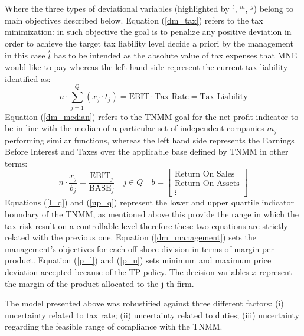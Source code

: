 \documentclass[conference,final,a4paper]{IEEEtran}
\begin{document}
Where the three types of deviational variables (highlighted by \(^t\),
\(^m\), \(^g\)) belong to main objectives described below. Equation (\ref{dm_tax}) refers to the tax minimization: in such objective the goal is to penalize any positive deviation in order to achieve the target tax liability level decide a priori by the management in this case $\overset{\star}{t}$ has to be intended as the absolute value of tax expenses that MNE would like to pay whereas the left hand side represent the current tax liability identified as:
  $$
  n\cdot \sum^{Q}_{j=1}(x_j\cdot t_j)  = \text{EBIT} \cdot \text{Tax Rate} = \text {Tax Liability} 
  $$
  Equation (\ref{dm_median}) refers to the TNMM goal for the net profit indicator to be in line with the median of a particular set of independent companies $m_j$ performing similar functions, whereas the left hand side represents the Earnings Before Interest and Taxes over the applicable base defined by TNMM in other terms:
  $$
  n\cdot \frac{x_j}{b_j} = \frac{\text{EBIT}_j}{\text{BASE}_j} \quad j \in Q \quad b = \begin{bmatrix} \text{Return On Sales} \\ \text{Return On Assets} \\ \vdots \end{bmatrix}
  $$
  Equations (\ref{l_q}) and (\ref{up_q}) represent the lower and upper quartile indicator boundary of the TNMM, as mentioned above this provide the range in which the tax risk result on a controllable level therefore these two equations are strictly related with the previous one. Equation (\ref{dm_management}) sets the management's objectives for each off-shore division in terms of margin per product. Equation (\ref{p_l}) and (\ref{p_u}) sets minimum and maximum price deviation accepted because of the TP policy. The decision variables \(x\) represent the margin of the product allocated to the j-th firm.

The model presented above was robustified against three
different factors: (i) uncertainty related to tax rate; (ii) uncertainty related to duties; (iii) uncertainty regarding the feasible range of compliance with the TNMM.
\end{document}

